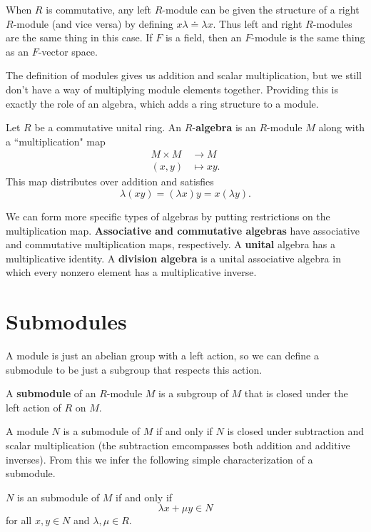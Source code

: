 \documentclass[twoside,10pt]{report}
\begin{document}
When $R$ is commutative, any left $R$-module can be given the structure of a right $R$-module (and vice versa) by defining $x \lambda \doteq \lambda x$. Thus left and right $R$-modules are the same thing in this case. If $F$ is a field, then an $F$-module is the same thing as an $F$-vector space.

The definition of modules gives us addition and scalar multiplication, but we still don't have a way of multiplying module elements together. Providing this is exactly the role of an algebra, which adds a ring structure to a module.

\begin{defn}[]
Let $R$ be a commutative unital ring. An $R$-\textbf{algebra} is an $R$-module $M$ along with a ``multiplication" map
\begin{align*}
	M \times M &\to M \\
	(x,y) &\mapsto xy.
\end{align*}
This map distributes over addition and satisfies
\[
	\lambda(xy) = (\lambda x)y = x (\lambda y).
\] 
\end{defn}

We can form more specific types of algebras by putting restrictions on the multiplication map. \textbf{Associative and commutative algebras} have associative and commutative multiplication maps, respectively. A \textbf{unital} algebra has a multiplicative identity. A \textbf{division algebra} is a unital associative algebra in which every nonzero element has a multiplicative inverse.

\section{Submodules}

A module is just an abelian group with a left action, so we can define a submodule to be just a subgroup that respects this action.

\begin{defn}[]
A \textbf{submodule} of an $R$-module $M$ is a subgroup of $M$ that is closed under the left action of $R$ on $M$.
\end{defn}

A module $N$ is a submodule of $M$ if and only if $N$ is closed under subtraction and scalar multiplication (the subtraction emcompasses both addition and additive inverses). From this we infer the following simple characterization of a submodule.
\begin{prop}
$N$ is an submodule of $M$ if and only if
\[
\lambda x + \mu y \in N
\] for all $x,y \in N$ and $\lambda,\mu \in R$.
\end{prop}
\end{document}
